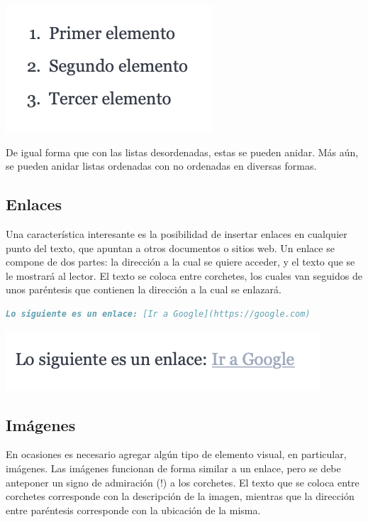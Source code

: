 \includegraphics[]{anexos/markdown/imagenes/md_olist.png}

De igual forma que con las listas desordenadas, estas se pueden anidar. Más
aún, se pueden anidar listas ordenadas con no ordenadas en diversas formas.

\subsection*{Enlaces}

Una característica interesante es la posibilidad de insertar enlaces en cualquier
punto del texto, que apuntan a otros documentos o sitios web. Un enlace se compone
de dos partes: la dirección a la cual se quiere acceder, y el texto que se le
mostrará al lector. El texto se coloca entre corchetes, los cuales van seguidos
de unos paréntesis que contienen la dirección a la cual se enlazará.

\begin{lstlisting}[language=Markdown]
Lo siguiente es un enlace: [Ir a Google](https://google.com)
\end{lstlisting}

\includegraphics[]{anexos/markdown/imagenes/md_enlace.png}

\subsection*{Imágenes}

En ocasiones es necesario agregar algún tipo de elemento visual, en particular,
imágenes. Las imágenes funcionan de forma similar a un enlace, pero se debe
anteponer un signo de admiración (!) a los corchetes. El texto que se coloca
entre corchetes corresponde con la descripción de la imagen, mientras que la
dirección entre paréntesis corresponde con la ubicación de la misma.


